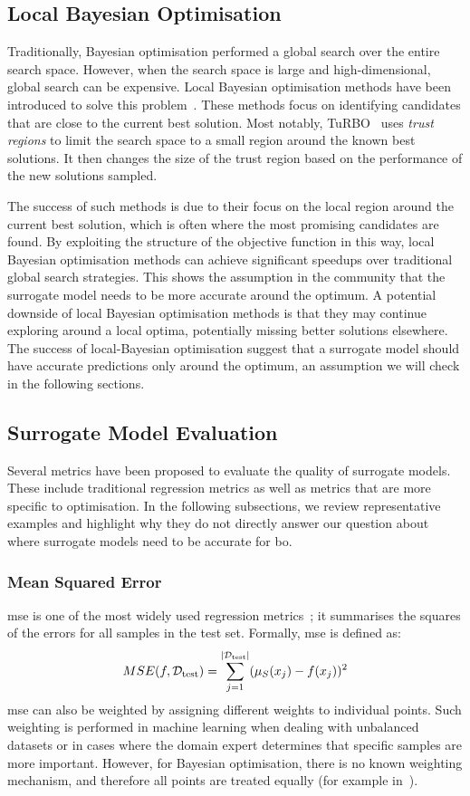 \subsection{Local Bayesian Optimisation}
Traditionally, Bayesian optimisation performed a global search over the entire search space. However, when the search space is large and high-dimensional, global search can be expensive. Local Bayesian optimisation methods have been introduced to solve this problem~\citep{EriEtAl19,NguEtAl22,PapEtAl22}.
These methods focus on identifying candidates that are close to the current best
solution. Most notably, TuRBO~\citep{EriEtAl19} uses \textit{trust regions} to limit the search space to a small region around the known best solutions. It then changes the size of the trust region based on the performance of the new solutions sampled.

The success of such methods is due to their focus on the local region around the current best solution, which is often where the most promising candidates are found. By exploiting the structure of the objective function in this way, local Bayesian optimisation methods can achieve significant speedups over traditional global search strategies. This shows the assumption in the community that the surrogate model needs to be more accurate around the optimum.
A potential downside of local Bayesian optimisation methods is that they may continue exploring around a local optima, potentially missing better solutions elsewhere.
The success of local-Bayesian optimisation suggest that a surrogate model should have accurate predictions only around the optimum, an assumption we will check in the following sections.

\subsection{Surrogate Model Evaluation}
Several metrics have been proposed to evaluate the quality of surrogate models. These include traditional regression metrics as well as metrics that are more specific to optimisation. In the following subsections, we review representative examples and highlight why they do not directly answer our question about where surrogate models need to be accurate for \gls{bo}.

\subsubsection{Mean Squared Error}
\Gls{mse} is one of the most widely used regression metrics~\citep{EimEtAl25,GijEtAl24}; it summarises the squares of the errors for all samples in the test set.
Formally, \gls{mse} is defined as:
\begin{equation*}
    MSE(f, \mathcal{D}_{\text{test}})=\sum_{j=1}^{|\mathcal{D}_{\text{test}}|}(\mu_S(x_j)-f(x_j))^2
\end{equation*}
\gls{mse} can also be weighted by assigning different weights to individual points. Such weighting is performed in machine learning when dealing with unbalanced datasets or in cases where the domain expert determines that specific samples are more important. However, for Bayesian optimisation, there is no known weighting mechanism, and therefore all points are treated equally (for example in~\citet{SanEtAl24}).

